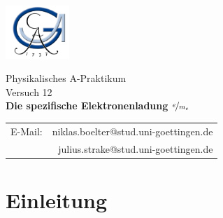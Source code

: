 \documentclass[a4paper,twoside]{article}
\begin{document}
\begin{titlepage}
\includegraphics[height=2cm]{georg} \hfill

\normalsize

\vspace{5cm}

\begin{center}
\Large Physikalisches A-Praktikum \\
\Huge Versuch 12 \\[5mm]
{\bf Die spezifische Elektronenladung $\nicefrac{e}{m_e}$}
\end{center}

\normalsize

\begin{table}[!h]
\begin{center}
\vspace{2.0cm}
\begin{tabular}{lr}
  E-Mail: & \ttfamily niklas.boelter@stud.uni-goettingen.de\\
          & \ttfamily julius.strake@stud.uni-goettingen.de\\
\end{tabular}
\end{center}
\end{table}
\end{titlepage}
\pagestyle{empty}
\clearpage\markboth{}{}\cleardoublepage
\pagestyle{empty}
\tableofcontents
\newpage
\pagestyle{headings}
\section{Einleitung}

\end{document}
